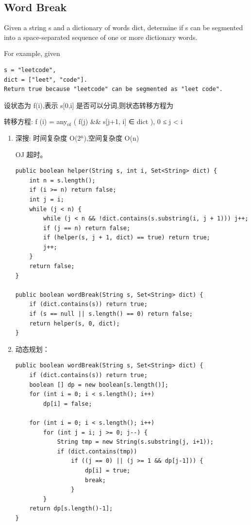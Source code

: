 \documentclass[12pt]{book}
\begin{document}
\subsection{Word Break}
\label{sec-14-2-10}
Given a string s and a dictionary of words dict, determine if s can be segmented into a space-separated sequence of one or more dictionary words.

For example, given
\lstset{language=java,label= ,caption= ,numbers=none}
\begin{lstlisting}
s = "leetcode",
dict = ["leet", "code"].
Return true because "leetcode" can be segmented as "leet code".
\end{lstlisting}

设状态为 f(i),表示 s[0,i] 是否可以分词,则状态转移方程为

转移方程: f (i) = any$_{\text{of}}$ ( f(j) \&\& s[j+1, i] ∈ dict ), 0 ≤ j < i
\begin{enumerate}
\item 深搜: 时间复杂度 O(2$^{\text{n}}$),空间复杂度 O(n)
\label{sec-14-2-10-1}

OJ 超时。
\lstset{language=java,label= ,caption= ,numbers=none}
\begin{lstlisting}
public boolean helper(String s, int i, Set<String> dict) {
    int n = s.length();
    if (i >= n) return false;
    int j = i;
    while (j < n) {
        while (j < n && !dict.contains(s.substring(i, j + 1))) j++;
        if (j == n) return false;
        if (helper(s, j + 1, dict) == true) return true;
        j++;
    }
    return false;
}
        
public boolean wordBreak(String s, Set<String> dict) {
    if (dict.contains(s)) return true;
    if (s == null || s.length() == 0) return false;
    return helper(s, 0, dict);
}
\end{lstlisting}
\item 动态规划：
\label{sec-14-2-10-2}
\lstset{language=java,label= ,caption= ,numbers=none}
\begin{lstlisting}
public boolean wordBreak(String s, Set<String> dict) {
    if (dict.contains(s)) return true;
    boolean [] dp = new boolean[s.length()];
    for (int i = 0; i < s.length(); i++) 
        dp[i] = false;

    for (int i = 0; i < s.length(); i++)
        for (int j = i; j >= 0; j--) {
            String tmp = new String(s.substring(j, i+1));
            if (dict.contains(tmp))
                if ((j == 0) || (j >= 1 && dp[j-1])) {
                    dp[i] = true;
                    break;
                }
        }
    return dp[s.length()-1];
}
\end{lstlisting}
\end{enumerate}
\end{document}

